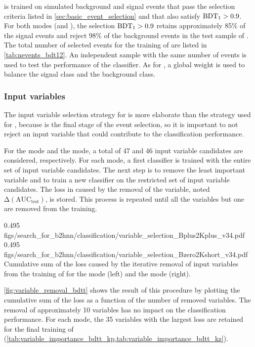 \bdtt is trained on simulated background and signal events that pass the selection criteria listed in \cref{sec:basic_event_selection} and that also satisfy $\mathrm{BDT_1}>0.9$.
For both modes (\BKpnn and \BKznn), the selection $\mathrm{BDT_1}>0.9$ retains approximately 85\% of the signal events and reject 98\% of the background events in the test sample of \bdto.
The total number of selected events for the training of \bdtt are listed in \cref{tab:nevents_bdt12}.
An independent sample with the same number of events is used to test the performance of the classifier.
As for \bdto, a global weight is used to balance the signal class and the background class.

\subsubsection*{Input variables}
The input variable selection strategy for \bdtt is more elaborate than the strategy used for \bdto, because \bdtt is the final stage of the event selection, so it is important to not reject an input variable that could contribute to the classification performance.

For the \BKpnn mode and the \BKznn mode, a total of 47 and 46 input variable candidates are considered, respectively.
For each mode, a first classifier is trained with the entire set of input variable candidates.
The next step is to remove the least important variable and to train a new classifier on the restricted set of input variable candidates.
The loss in \auctest caused by the removal of the variable, noted $\mathrm{\Delta(AUC_{test})}$, is stored.
This process is repeated until all the variables but one are removed from the training.

{0.495}
{figs/search_for_b2hnn/classification/variable_selection_Bplus2Kplus_v34.pdf}
{0.495}
{figs/search_for_b2hnn/classification/variable_selection_Bzero2Kshort_v34.pdf}
{
Cumulative sum of the \auctest loss caused by the iterative removal of input variables from the training of \bdtt for the \BKpnn mode (left) and the \BKznn mode (right).
}

\cref{fig:variable_removal_bdtt} shows the result of this procedure by plotting the cumulative sum of the \auctest loss as a function of the number of removed variables.
The removal of approximately 10 variables has no impact on the classification performance.
For each mode, the 35 variables with the largest loss are retained for the final training of \bdtt (\cref{tab:variable_importance_bdtt_kp,tab:variable_importance_bdtt_kz}).

